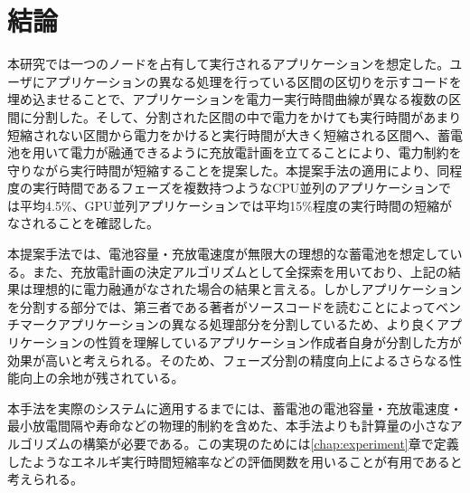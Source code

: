 \chapter{結論}
\label{chap:conclusion}


本研究では一つのノードを占有して実行されるアプリケーションを想定した。ユーザにアプリケーションの異なる処理を行っている区間の区切りを示すコードを埋め込ませることで、アプリケーションを電力ー実行時間曲線が異なる複数の区間に分割した。そして、分割された区間の中で電力をかけても実行時間があまり短縮されない区間から電力をかけると実行時間が大きく短縮される区間へ、蓄電池を用いて電力が融通できるように充放電計画を立てることにより、電力制約を守りながら実行時間が短縮することを提案した。本提案手法の適用により、同程度の実行時間であるフェーズを複数持つようなCPU並列のアプリケーションでは平均4.5\%、GPU並列アプリケーションでは平均15\%程度の実行時間の短縮がなされることを確認した。

本提案手法では、電池容量・充放電速度が無限大の理想的な蓄電池を想定している。また、充放電計画の決定アルゴリズムとして全探索を用いており、上記の結果は理想的に電力融通がなされた場合の結果と言える。しかしアプリケーションを分割する部分では、第三者である著者がソースコードを読むことによってベンチマークアプリケーションの異なる処理部分を分割しているため、より良くアプリケーションの性質を理解しているアプリケーション作成者自身が分割した方が効果が高いと考えられる。そのため、フェーズ分割の精度向上によるさらなる性能向上の余地が残されている。

本手法を実際のシステムに適用するまでには、蓄電池の電池容量・充放電速度・最小放電間隔や寿命などの物理的制約を含めた、本手法よりも計算量の小さなアルゴリズムの構築が必要である。この実現のためには\ref{chap:experiment}章で定義したようなエネルギ実行時間短縮率などの評価関数を用いることが有用であると考えられる。